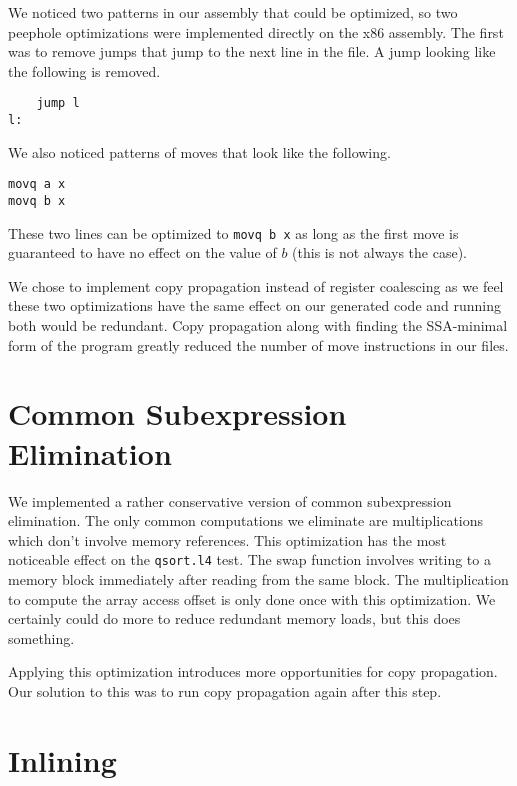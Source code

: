 \documentclass[aps,letterpaper,11pt]{revtex4}
\begin{document}
We noticed two patterns in our assembly that could be optimized, so two peephole optimizations were implemented
directly on the x86 assembly. The first was to remove jumps that jump to the next line in the file. A jump
looking like the following is removed.

\begin{verbatim}
    jump l
l:
\end{verbatim}

We also noticed patterns of moves that look like the following.

\begin{verbatim}
movq a x
movq b x
\end{verbatim}

These two lines can be optimized to \texttt{movq b x} as long as the first move is guaranteed to have no effect
on the value of $b$ (this is not always the case).

We chose to implement copy propagation instead of register coalescing as we feel these two optimizations have
the same effect on our generated code and running both would be redundant. Copy propagation along with finding
the SSA-minimal form of the program greatly reduced the number of move instructions in our files.

\section{Common Subexpression Elimination}
We implemented a rather conservative version of common subexpression elimination. The only common computations
we eliminate are multiplications which don't involve memory references. This optimization has the most noticeable
effect on the \texttt{qsort.l4} test. The swap function involves writing to a memory block immediately after
reading from the same block. The multiplication to compute the array access offset is only done once with this
optimization. We certainly could do more to reduce redundant memory loads, but this does something.

Applying this optimization introduces more opportunities for copy propagation. Our solution to this was to
run copy propagation again after this step.

\section{Inlining}
\end{document}
